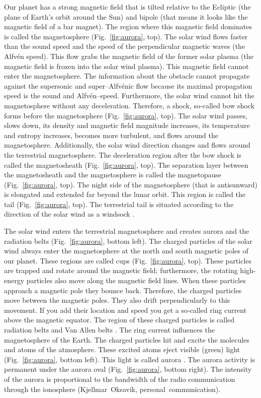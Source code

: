 \documentclass[sn-aps]{sn-jnl}%
\begin{document}
Our planet has a strong magnetic field that is tilted relative to the Ecliptic (the plane of Earth's orbit around the Sun) and bipole (that means it looks like the magnetic field of a bar magnet). The region where this magnetic field dominates is called the magnetosphere (Fig.~\ref{fig:aurora}, top). The solar wind flows faster than the sound speed and the speed of the perpendicular magnetic waves (the Alfv{\'e}n speed). This flow grabs the magnetic field of the former solar plasma (the magnetic field is frozen into the solar wind plasma). This magnetic field cannot enter the magnetosphere. The information about the obstacle cannot propagate against the supersonic and super--Alfv{\'e}nic flow because its maximal propagation speed is the sound and Alfv{\'e}n--speed. Furthermore, the solar wind cannot hit the magnetosphere without any deceleration. Therefore, a shock, so-called bow shock forms before the magnetosphere (Fig.~\ref{fig:aurora}, top). The solar wind passes, slows down, its density and magnetic field magnitude increases, its temperature and entropy increases, becomes more turbulent, and flows around the magnetosphere. Additionally, the solar wind direction changes and flows around the terrestrial magnetosphere. The deceleration region after the bow shock is called the magnetosheath (Fig.~\ref{fig:aurora}, top). The separation layer between the magnetosheath and the magnetosphere is called the magnetopause (Fig.~\ref{fig:aurora}, top). The night side of the magnetosphere (that is antisunward) is elongated and extended far beyond the lunar orbit. This region is called the tail (Fig.~\ref{fig:aurora}, top). The terrestrial tail is situated according to the direction of the solar wind as a windsock \cite{scherer05:_space_weath,voeroes14:_winds_condit_ram_co_ram,shang20:_unusual_locat_geotail_magnet_near_lunar_orbit}. 

The solar wind enters the terrestrial magnetosphere and creates aurora and the radiation belts (Fig.~\ref{fig:aurora}, bottom left). The charged particles of the solar wind always enter the magnetosphere at the north and south magnetic poles of our planet. These regions are called cups (Fig.~\ref{fig:aurora}, top). These particles are trapped and rotate around the magnetic field; furthermore, the rotating high-energy particles also move along the magnetic field lines. When these particles approach a magnetic pole they bounce back. Therefore, the charged particles move between the magnetic poles. They also drift perpendicularly to this movement. If you add their location and speed you get a so-called ring current above the magnetic equator. The region of these charged particles is called radiation belts and Van Allen belts \cite{scherer05:_space_weath}. The ring current influences the magnetosphere of the Earth. The charged particles hit and excite the molecules and atoms of the atmosphere. These excited atoms eject visible (green) light (Fig.~\ref{fig:aurora}, bottom left). This light is called aurora \cite{scherer05:_space_weath}. The aurora activity is permanent under the aurora oval (Fig.~\ref{fig:aurora}, bottom right). The intensity of the aurora is proportional to the bandwidth of the radio communication through the ionosphere (Kjellmar~Oksavik, personal~communication).
\end{document}

